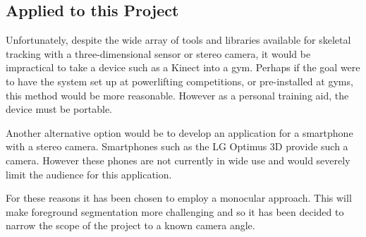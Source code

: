 \subsection{Applied to this Project}

Unfortunately, despite the wide array of tools and libraries available for skeletal tracking with a three-dimensional sensor or stereo camera, it would be impractical to take a device such as a Kinect into a gym. Perhaps if the goal were to have the system set up at powerlifting competitions, or pre-installed at gyms, this method would be more reasonable. However as a personal training aid, the device must be portable.

Another alternative option would be to develop an application for a smartphone with a stereo camera. Smartphones such as the LG Optimus 3D\cite{lgoptimus} provide such a camera. However these phones are not currently in wide use and would severely limit the audience for this application.

For these reasons it has been chosen to employ a monocular approach. This will make foreground segmentation more challenging and so it has been decided to narrow the scope of the project to a known camera angle.